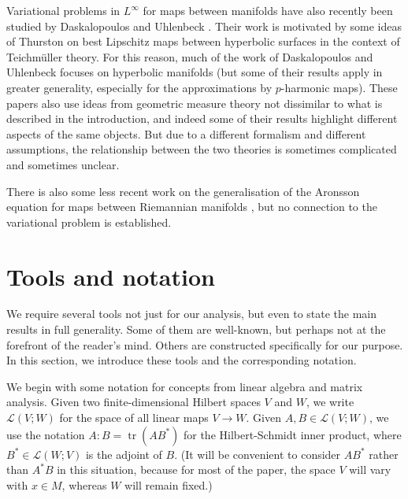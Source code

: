 \documentclass[10pt,a4paper]{amsart}
\newcommand{\Lin}{\mathcal{L}}
\DeclareMathOperator{\tr}{tr}
\begin{document}
Variational problems in $L^\infty$ for maps between manifolds have also recently been studied by
Daskalopoulos and Uhlenbeck \cite{Daskalopoulos-Uhlenbeck:24, Daskalopoulos-Uhlenbeck:22, Daskalopoulos-Uhlenbeck:24.2}.
Their work is motivated by some ideas of Thurston \cite{Thurston:98} on best Lipschitz maps
between hyperbolic surfaces in the context of Teichm\"uller theory.
For this reason, much of the work of Daskalopoulos and Uhlenbeck focuses on hyperbolic
manifolds (but some of their results apply in greater generality, especially for the
approximations by $p$-harmonic maps). These papers also use ideas from
geometric measure theory not dissimilar to what is described in the introduction, and indeed
some of their results highlight different aspects of the same objects. But due to a
different formalism and different assumptions, the relationship between the
two theories is sometimes complicated and sometimes unclear.

There is also some less recent work on the generalisation of the Aronsson equation for
maps between Riemannian manifolds \cite{Troutman:08, Wang-Ou:09, Ou-Troutman-Wilhelm:12}, but no
connection to the variational problem is established.











\section{Tools and notation} \label{sct:tools}

We require several tools not just for our analysis, but even to state the
main results in full generality. Some of them are well-known, but perhaps not
at the forefront of the reader's mind. Others are constructed specifically
for our purpose.
In this section, we introduce these tools and the corresponding notation.

We begin with some notation for concepts from linear algebra and matrix analysis.
Given two finite-dimensional Hilbert spaces
$V$ and $W$, we write $\Lin(V; W)$ for the space of all linear maps $V \to W$.
Given $A, B \in \Lin(V; W)$, we use the notation $A : B = \tr (A B^*)$ for the Hilbert-Schmidt inner product, where $B^* \in \Lin(W; V)$ is the adjoint of $B$.
(It will be convenient to consider $AB^*$ rather than $A^*B$ in this
situation, because for most of the paper,
the space $V$ will vary with $x \in M$, whereas $W$ will remain fixed.)
\end{document}
